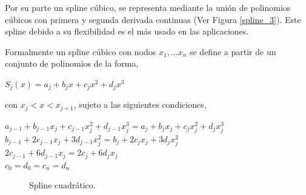 \hspace{0.4cm} Por su parte un spline c\'ubico, se representa mediante la uni\'on de polinomios c\'ubicos con primera y segunda derivada continuas (Ver Figura \ref{spline_3}). Este spline debido a su flexibilidad es el m\'as usado en las aplicaciones.


\hspace{0.4cm}Formalmente un spline c\'ubico con nodos $x_{1},...x_{n}$ se define a partir de un conjunto de polinomios de la forma,\\

\begin{center}

$\displaystyle{S_{j}(x) = a_{j} + b_{j}x +c_{j}x^2 +d_{j}x^3}$
\end{center}


\vspace{0.5cm}

\noindent con $x_{j}<x<x_{j+1}$, sujeto a las siguientes condiciones,\\

\newpage

\begin{center}

$\displaystyle{a_{j-1} + b_{j-1}x_{j} +c_{j-1}x_{j}^2 +d_{j-1}x_{j}^3 = a_{j} + b_{j}x_{j} +c_{j}x_{j}^2 +d_{j}x_{j}^3}$\\
$\displaystyle{ b_{j-1} +2c_{j-1}x_{j} +3d_{j-1}x_{j}^2 = b_{j} +2c_{j}x_{j} +3d_{j}x_{j}^2}$\\
$\displaystyle{ 2c_{j-1} +6d_{j-1}x_{j} = 2c_{j} +6d_{j}x_{j}}$\\
$\displaystyle{ c_{0} = d_{0} = c_{n} =d_{n}}$

\end{center}

\begin{figure}[h]
\caption{Spline cuadr\'atico.}
\label{spline_c}
\end{figure}

